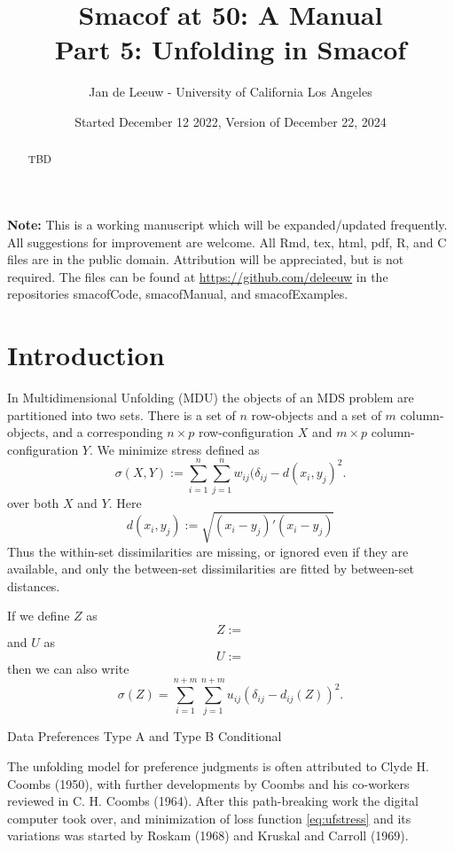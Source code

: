 \documentclass[
  12pt,
]{article}
\title{Smacof at 50: A Manual\\
Part 5: Unfolding in Smacof}
\author{Jan de Leeuw - University of California Los Angeles}
\date{Started December 12 2022, Version of December 22, 2024}
\begin{document}
\maketitle
\begin{abstract}
TBD
\end{abstract}

{
\setcounter{tocdepth}{3}
\tableofcontents
}
\textbf{Note:} This is a working manuscript which will be expanded/updated
frequently. All suggestions for improvement are welcome. All Rmd, tex,
html, pdf, R, and C files are in the public domain. Attribution will be
appreciated, but is not required. The files can be found at
\url{https://github.com/deleeuw} in the repositories smacofCode, smacofManual,
and smacofExamples.

\section{Introduction}\label{introduction}

In Multidimensional Unfolding (MDU) the objects of an MDS problem are partitioned into two sets.
There is a set of \(n\) row-objects and a set of
\(m\) column-objects, and a corresponding \(n\times p\) row-configuration \(X\) and \(m\times p\) column-configuration
\(Y\). We minimize stress defined as
\begin{equation}
\sigma(X,Y):=\sum_{i=1}^{n}\sum_{j=1}^{n}w_{ij}(\delta_{ij}-d(x_i,y_j)^2.
\label{eq:ufstress}
\end{equation}
over both \(X\) and \(Y\). Here
\begin{equation}
d(x_i,y_j):=\sqrt{(x_i-y_j)'(x_i-y_j)}
\label{eq:ufdist}
\end{equation}
Thus the within-set
dissimilarities are missing, or ignored even if they are available, and only the between-set dissimilarities are fitted by between-set distances.

If we define \(Z\) as
\begin{equation}
Z:=
\end{equation}
and \(U\) as
\begin{equation}
U:=
\label{eq:ufudef}
\end{equation}
then we can also write
\begin{equation}
\sigma(Z)=\sum_{i=1}^{n+m}\sum_{j=1}^{n+m}u_{ij}(\delta_{ij}-d_{ij}(Z))^2.
\label{eq:ufzstress}
\end{equation}

Data Preferences Type A and Type B Conditional

The unfolding model for preference judgments is often attributed to Clyde H. Coombs (1950),
with further developments by Coombs and his co-workers reviewed in C. H. Coombs (1964).
After this path-breaking work the digital computer took over, and minimization of loss function
\eqref{eq:ufstress} and its variations was started by
Roskam (1968) and Kruskal and Carroll (1969).
\end{document}
